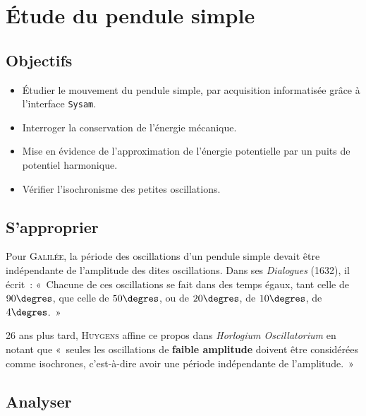 \documentclass[a4paper, 11pt, final, garamond]{book}
\begin{document}
\setcounter{chapter}{16}

\chapter{\'Etude du pendule simple}

\section{Objectifs}

\begin{itemize}
    \item Étudier le mouvement du pendule simple, par acquisition
        informatisée grâce à l'interface \texttt{Sysam}.
    \item Interroger la conservation de l'énergie mécanique.
    \item Mise en évidence de l'approximation de l'énergie potentielle par un
        puits de potentiel harmonique.
    \item Vérifier l'isochronisme des petites oscillations.
\end{itemize}

\section{S'approprier}

Pour \textsc{Galilée}, la période des oscillations d'un pendule simple devait
être indépendante de l'amplitude des dites oscillations. Dans ses
\textit{Dialogues} (1632), il écrit~: «~Chacune de ces oscillations se fait dans
des temps égaux, tant celle de $90\degres$, que celle de $50\degres$, ou de
$20\degres$, de $10\degres$, de $4\degres$.~»

\medskip

26 ans plus tard, \textsc{Huygens} affine ce propos dans \textit{Horlogium
Oscillatorium} en notant que «~seules les oscillations de \textbf{faible 
amplitude} doivent être considérées comme isochrones, c'est-à-dire avoir une
période indépendante de l'amplitude.~»
 
\section{Analyser}
\end{document}
